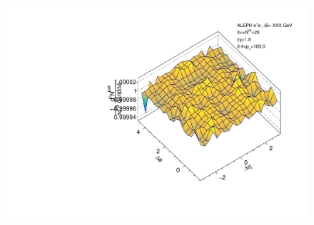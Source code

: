 \begin{figure}[htbp]
\begin{minipage}[b]{0.32\linewidth}
    \label{fig:LEP1 Beam Axis, Ratio Plot, Multiplicity 0-20, Anthony}
  \end{minipage}
  \hspace{0.0cm}
  \begin{minipage}[b]{0.32\linewidth}
    \centering
    \includegraphics[width=\linewidth]{images/TwoParticleCorrelation/LEP1_BEAM/LEP1_BEAM_r_ratio_0_20.pdf}
    \label{fig:LEP1 Beam Axis, Ratio Plot, Multiplicity 0-20, Ratio}
  \end{minipage}
\end{figure}


